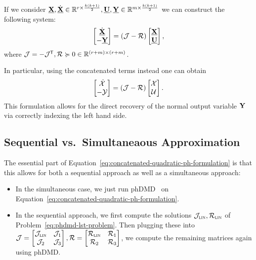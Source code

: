 If we consider $\underline{\mathbf{X}}, \underline{\dot{\mathbf{X}}} \in \mathbb{R}^{r \times \frac{k (k + 1)}{2}}, \underline{\mathbf{U}}, \underline{\mathbf{Y}} \in \mathbb{R}^{m \times \frac{k (k + 1)}{2}}$ we can construct the following system:
\begin{equation*}
    \begin{bmatrix}
        \underline{\dot{\mathbf{X}}} \\
        -\underline{\mathbf{Y}}
    \end{bmatrix}
    = (\mathcal{J} - \mathcal{R})
    \begin{bmatrix}
        \underline{\mathbf{X}} \\
        \underline{\mathbf{U}}
    \end{bmatrix},
\end{equation*}
where $\mathcal{J} = -\mathcal{J}^{\mkern-1.5mu \mathsf{T}}, \mathcal{R} \succcurlyeq 0 \in \mathbb{R}^{(r + m) \times (r + m)}$.

In particular, using the concatenated terms instead one can obtain
\begin{equation}\label{eq:concatenated-quadratic-ph-formulation}
    \begin{bmatrix}
        \dot{\mathcal{X}} \\
        -\mathcal{Y}
    \end{bmatrix}
    = (\mathcal{J} - \mathcal{R})
    \begin{bmatrix}
        \mathcal{X} \\
        \mathcal{U}
    \end{bmatrix}.
\end{equation}
This formulation allows for the direct recovery of the normal output variable $\mathbf{Y}$ via correctly indexing the left hand side.

\subsection{Sequential vs.\ Simultaneaous Approximation}

The essential part of Equation~\eqref{eq:concatenated-quadratic-ph-formulation} is that this allows for both a sequential approach as well as a simultaneous approach:
\begin{itemize}
    \item In the simultaneous case, we just run phDMD~\cite{Morandin2022} on Equation~\eqref{eq:concatenated-quadratic-ph-formulation}.
    \item In the sequential approach, we first compute the solutions $\mathcal{J}_\textsc{lin}, \mathcal{R}_\textsc{lin}$ of Problem~\eqref{eq:phdmd-lst-problem}. Then plugging these into $\mathcal{J} = \begin{bmatrix}
        \mathcal{J}_\textsc{lin} & \mathcal{J}_1 \\
        \mathcal{J}_2 & \mathcal{J}_3
    \end{bmatrix}, \mathcal{R} = \begin{bmatrix}
        \mathcal{R}_\textsc{lin} & \mathcal{R}_1 \\
        \mathcal{R}_2 & \mathcal{R}_3
    \end{bmatrix}$, we compute the remaining matrices again using phDMD\@.
\end{itemize}

